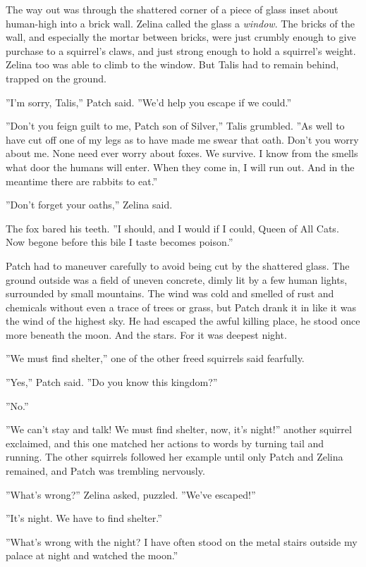 \documentclass[12pt]{book}
\begin{document}
 The way out was through the shattered corner of a piece of glass inset about human-high into a brick wall. Zelina called the glass a {\it window}. The bricks of the wall, and especially the mortar between bricks, were just crumbly enough to give purchase to a squirrel's claws, and just strong enough to hold a squirrel's weight. Zelina too was able to climb to the window. But Talis had to remain behind, trapped on the ground.\par
 ''I'm sorry, Talis,'' Patch said. ''We'd help you escape if we could.''\par
 ''Don't you feign guilt to me, Patch son of Silver,'' Talis grumbled. ''As well to have cut off one of my legs as to have made me swear that oath. Don't you worry about me. None need ever worry about foxes. We survive. I know from the smells what door the humans will enter. When they come in, I will run out. And in the meantime there are rabbits to eat.''\par
 ''Don't forget your oaths,'' Zelina said.\par
 The fox bared his teeth. ''I should, and I would if I could, Queen of All Cats. Now begone before this bile I taste becomes poison.''\par
 Patch had to maneuver carefully to avoid being cut by the shattered glass. The ground outside was a field of uneven concrete, dimly lit by a few human lights, surrounded by small mountains. The wind was cold and smelled of rust and chemicals without even a trace of trees or grass, but Patch drank it in like it was the wind of the highest sky. He had escaped the awful killing place, he stood once more beneath the moon. And the stars. For it was deepest night.\par
 ''We must find shelter,'' one of the other freed squirrels said fearfully.\par
 ''Yes,'' Patch said. ''Do you know this kingdom?''\par
 ''No.''\par
 ''We can't stay and talk! We must find shelter, now, it's night!'' another squirrel exclaimed, and this one matched her actions to words by turning tail and running. The other squirrels followed her example until only Patch and Zelina remained, and Patch was trembling nervously.\par
 ''What's wrong?'' Zelina asked, puzzled. ''We've escaped!''\par
 ''It's night. We have to find shelter.''\par
 ''What's wrong with the night? I have often stood on the metal stairs outside my palace at night and watched the moon.''\par
\end{document}
